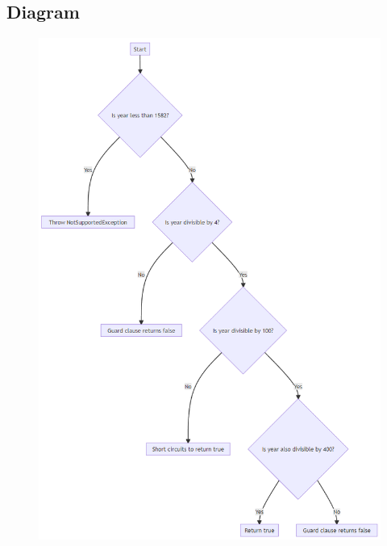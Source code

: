 \documentclass[11pt,a4paper]{article}
\begin{document}
\subsection{Diagram}
\begin{figure}[h!]
    \centering
    \includegraphics[width=0.95\linewidth]{diagram.png}
\end{figure}
\end{document}
